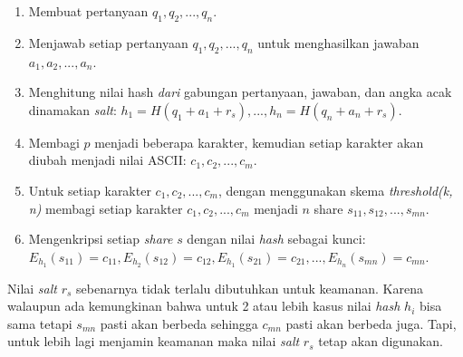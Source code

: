 \begin{enumerate}[label={(\arabic*)}]
	\item Membuat pertanyaan \begin{math}q_1, q_2, ..., q_n\end{math}.
	\item Menjawab setiap pertanyaan \begin{math}q_1, q_2, ..., q_n\end{math} untuk menghasilkan jawaban \begin{math}a_1, a_2, ..., a_n\end{math}.
	\item Menghitung nilai hash \textit{dari} gabungan pertanyaan, jawaban, dan angka acak dinamakan \textit{salt}: \begin{math}h_1 = H(q_1+a_1+r_s), ..., h_n = H(q_n+a_n+r_s)\end{math}.
	\item Membagi \begin{math}p\end{math} menjadi beberapa karakter, kemudian setiap karakter akan diubah menjadi nilai ASCII: \begin{math}c_1, c_2, ..., c_m\end{math}.
	\item Untuk setiap karakter \begin{math}c_1, c_2, ..., c_m\end{math}, dengan menggunakan skema \textit{threshold(k, n)} membagi setiap karakter \begin{math}c_1, c_2, ..., c_m\end{math} menjadi \begin{math}n\end{math} share \begin{math}s_{11}, s_{12}, ..., s_{mn}\end{math}.
	\item Mengenkripsi setiap \textit{share} \begin{math}s\end{math} dengan nilai \textit{hash} sebagai kunci: \begin{math}E_{h_1}(s_{11}) = c_{11}, E_{h_2}(s_{12}) = c_{12}, E_{h_1}(s_{21}) = c_{21}, ..., E_{h_n}(s_{mn}) = c_{mn}\end{math}.
\end{enumerate}

Nilai \textit{salt} \begin{math}r_s\end{math} sebenarnya tidak terlalu dibutuhkan untuk keamanan. Karena walaupun ada kemungkinan bahwa untuk 2 atau lebih kasus  nilai \textit{hash} \begin{math}h_i\end{math} bisa sama tetapi \begin{math}s_{mn}\end{math} pasti akan berbeda sehingga \begin{math}c_{mn}\end{math} pasti akan berbeda juga. Tapi, untuk lebih lagi menjamin keamanan maka nilai \textit{salt} \begin{math}r_s\end{math} tetap akan digunakan.


